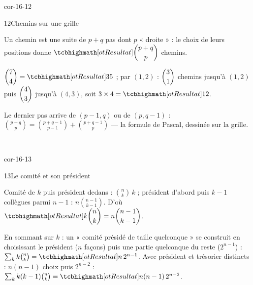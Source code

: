 \begin{blocLivre}{cor-16-12}
\begin{corrige}{12}{Chemins sur une grille}
\begin{questions}
  \item Un chemin est une suite de $p+q$ pas dont $p$ « droite » : le
    choix de leurs positions donne $\res{\dbinom{p+q}{p}}$ chemins.
  \item $\dbinom74=\res{35}$ ; par $(1,2)$ : $\dbinom31$ chemins jusqu'à
    $(1,2)$ puis $\dbinom43$ jusqu'à $(4,3)$, soit $3\times4=\res{12}$.
  \item Le dernier pas arrive de $(p-1,q)$ ou de $(p,q-1)$ :
    $\binom{p+q}{p}=\binom{p+q-1}{p-1}+\binom{p+q-1}{p}$ — la formule de
    Pascal, dessinée sur la grille.
\end{questions}
\medskip
\begin{center}
\\[0.5mm]
\end{center}
\end{corrige}
\end{blocLivre}

\begin{blocLivre}{cor-16-13}
\begin{corrige}{13}{Le comité et son président}
\begin{questions}
  \item Comité de $k$ puis président dedans : $\binom nk\,k$ ; président
    d'abord puis $k-1$ collègues parmi $n-1$ : $n\binom{n-1}{k-1}$.
    D'où $\res{k\dbinom nk=n\dbinom{n-1}{k-1}}$.
  \item En sommant sur $k$ : un « comité présidé de taille quelconque »
    se construit en choisissant le président ($n$ façons) puis une partie
    quelconque du reste ($2^{n-1}$) :
    $\sum_k k\binom nk=\res{n\,2^{n-1}}$. Avec président et trésorier
    distincts : $n(n-1)$ choix puis $2^{n-2}$ :
    $\sum_k k(k-1)\binom nk=\res{n(n-1)\,2^{n-2}}$.
\end{questions}
\end{corrige}
\end{blocLivre}

